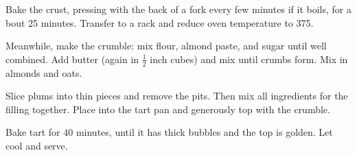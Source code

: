 \documentclass[12 pt, twoside]{amsart}
\begin{document}
{\begin{directions}
  \item Bake the crust, pressing with the back of a fork every few minutes if it boils, for a bout 25 minutes. Transfer to a rack and reduce oven temperature to 375.
  \item Meanwhile, make the crumble: mix flour, almond paste, and sugar until well combined. Add butter (again in $\frac{1}{2}$ inch cubes) and mix until crumbs form. Mix in almonds and oats.
  \item Slice plums into thin pieces and remove the pits. Then mix all ingredients for the filling together. Place into the tart pan and generously top with the crumble.
  \item Bake tart for 40 minutes, until it has thick bubbles and the top is golden. Let cool and serve.
\end{directions}
}
\end{document}
